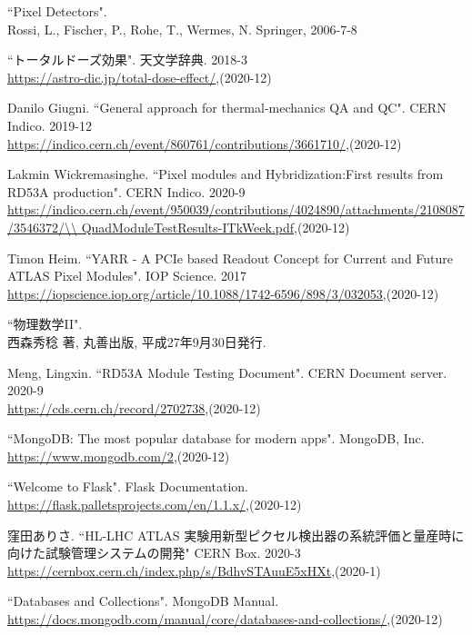 \begin{thebibliography}{9}
``Pixel Detectors". \\
Rossi, L., Fischer, P., Rohe, T., Wermes, N. Springer, 2006-7-8

``トータルドーズ効果". 天文学辞典. 2018-3\\
\url{https://astro-dic.jp/total-dose-effect/},(2020-12)

Danilo Giugni. ``General approach for thermal-mechanics QA and QC". CERN Indico. 2019-12\\
\url{https://indico.cern.ch/event/860761/contributions/3661710/},(2020-12)

Lakmin Wickremasinghe. ``Pixel modules and Hybridization:First results from RD53A production". CERN Indico. 2020-9\\
\url{https://indico.cern.ch/event/950039/contributions/4024890/attachments/2108087/3546372/\\
QuadModuleTestResults-ITkWeek.pdf},(2020-12)

Timon Heim. ``YARR - A PCIe based Readout Concept for Current and Future ATLAS Pixel Modules". IOP Science. 2017\\
\url{https://iopscience.iop.org/article/10.1088/1742-6596/898/3/032053},(2020-12)

``物理数学II".\\
西森秀稔 著, 丸善出版, 平成27年9月30日発行.

Meng, Lingxin. ``RD53A Module Testing Document". CERN Document server. 2020-9\\
\url{https://cds.cern.ch/record/2702738},(2020-12)

``MongoDB: The most popular database for modern apps". MongoDB, Inc. \\
\url{https://www.mongodb.com/2},(2020-12)

``Welcome to Flask". Flask Documentation. \\
\url{https://flask.palletsprojects.com/en/1.1.x/},(2020-12)

窪田ありさ. ``HL-LHC ATLAS 実験用新型ピクセル検出器の系統評価と量産時に向けた試験管理システムの開発" CERN Box. 2020-3\\
\url{https://cernbox.cern.ch/index.php/s/BdhvSTAuuE5xHXt},(2020-1)

``Databases and Collections". MongoDB Manual. \\
\url{https://docs.mongodb.com/manual/core/databases-and-collections/},(2020-12)


\end{thebibliography}

